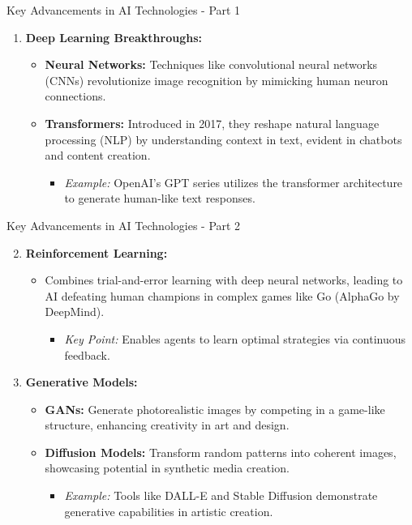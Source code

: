 \documentclass[aspectratio=169]{beamer}
\begin{document}
\begin{frame}[fragile]{Key Advancements in AI Technologies - Part 1}
    \begin{enumerate}
        \item \textbf{Deep Learning Breakthroughs:}
            \begin{itemize}
                \item \textbf{Neural Networks:} Techniques like convolutional neural networks (CNNs) revolutionize image recognition by mimicking human neuron connections.
                \item \textbf{Transformers:} Introduced in 2017, they reshape natural language processing (NLP) by understanding context in text, evident in chatbots and content creation.
                \begin{itemize}
                    \item \textit{Example:} OpenAI's GPT series utilizes the transformer architecture to generate human-like text responses.
                \end{itemize}
            \end{itemize}
    \end{enumerate}
\end{frame}

\begin{frame}[fragile]{Key Advancements in AI Technologies - Part 2}
    \begin{enumerate}
        \setcounter{enumi}{1} %
        \item \textbf{Reinforcement Learning:}
            \begin{itemize}
                \item Combines trial-and-error learning with deep neural networks, leading to AI defeating human champions in complex games like Go (AlphaGo by DeepMind).
                \begin{itemize}
                    \item \textit{Key Point:} Enables agents to learn optimal strategies via continuous feedback.
                \end{itemize}
            \end{itemize}
        \item \textbf{Generative Models:}
            \begin{itemize}
                \item \textbf{GANs:} Generate photorealistic images by competing in a game-like structure, enhancing creativity in art and design.
                \item \textbf{Diffusion Models:} Transform random patterns into coherent images, showcasing potential in synthetic media creation.
                \begin{itemize}
                    \item \textit{Example:} Tools like DALL-E and Stable Diffusion demonstrate generative capabilities in artistic creation.
                \end{itemize}
            \end{itemize}
    \end{enumerate}
\end{frame}
\end{document}
